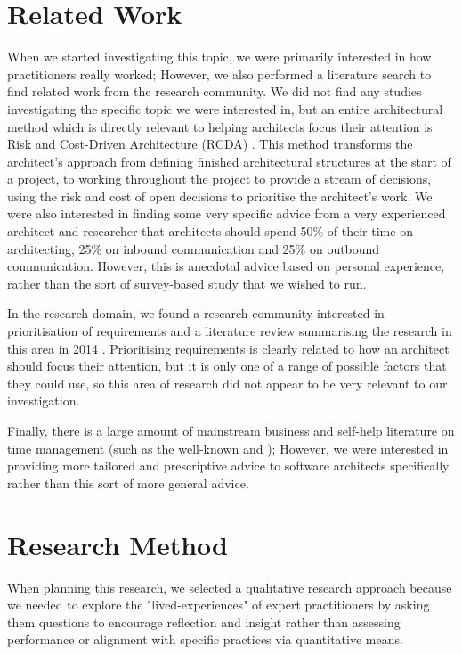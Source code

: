 \section{Related Work}

When we started investigating this topic, we were primarily interested in how practitioners really worked; However, we also performed a literature search to find related work from the research community.
We did not find any studies investigating the specific topic we were interested in, but an entire architectural method which is directly relevant to helping architects focus their attention is Risk and Cost-Driven Architecture (RCDA) \cite{poort2012-rcda}.  This method transforms the architect's approach from defining finished architectural structures at the start of a project, to working throughout the project to provide a stream of decisions, using the risk and cost of open decisions to prioritise the architect's work.  We were also interested in finding some very specific advice from a very experienced architect and researcher \cite{kruchten2008-architectsdo} that architects should spend 50\% of their time on architecting, 25\% on inbound communication and 25\% on outbound communication.  However, this is anecdotal advice based on personal experience, rather than the sort of survey-based study that we wished to run.

In the research domain, we found a research community interested in prioritisation of requirements \cite{berander2005-reqpriorization, hermann2008-reqprioritization} and a literature review summarising the research in this area in 2014 \cite{Achimugu2014-reqprio-litreview}.  Prioritising requirements is clearly related to how an architect should focus their attention, but it is only one of a range of possible factors that they could use, so this area of research did not appear to be very relevant to our investigation.

Finally, there is a large amount of mainstream business and self-help literature on time management (such as the well-known \cite{allen2015-gettingthingsdone} and \cite{koch1998-8020principle}); However, we were interested in providing more tailored and prescriptive advice to software architects specifically rather than this sort of more general advice.

\section{Research Method}

When planning this research, we selected a qualitative research approach because we needed to explore the "lived-experiences" of expert practitioners by asking them questions to encourage reflection and insight \cite{lapan2012-qualitativeresearch} rather than assessing performance or alignment with specific practices via quantitative means.


